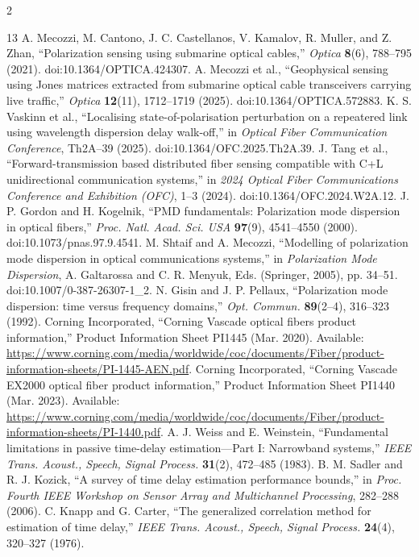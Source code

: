 \documentclass[10pt]{article}
\begin{document}
\begin{multicols}{2}
\begin{thebibliography}{13}\scriptsize
\setlength{\itemsep}{0pt}\setlength{\parskip}{0pt}
 A. Mecozzi, M. Cantono, J. C. Castellanos, V. Kamalov, R. Muller, and Z. Zhan, ``Polarization sensing using submarine optical cables,'' \emph{Optica} \textbf{8}(6), 788--795 (2021). doi:10.1364/OPTICA.424307.
 A. Mecozzi et al., ``Geophysical sensing using Jones matrices extracted from submarine optical cable transceivers carrying live traffic,'' \emph{Optica} \textbf{12}(11), 1712--1719 (2025). doi:10.1364/OPTICA.572883.
 K. S. Vaskinn et al., ``Localising state-of-polarisation perturbation on a repeatered link using wavelength dispersion delay walk-off,'' in \emph{Optical Fiber Communication Conference}, Th2A--39 (2025). doi:10.1364/OFC.2025.Th2A.39.
 J. Tang et al., ``Forward-transmission based distributed fiber sensing compatible with C+L unidirectional communication systems,'' in \emph{2024 Optical Fiber Communications Conference and Exhibition (OFC)}, 1--3 (2024). doi:10.1364/OFC.2024.W2A.12.
 J. P. Gordon and H. Kogelnik, ``PMD fundamentals: Polarization mode dispersion in optical fibers,'' \emph{Proc. Natl. Acad. Sci. USA} \textbf{97}(9), 4541--4550 (2000). doi:10.1073/pnas.97.9.4541.
 M. Shtaif and A. Mecozzi, ``Modelling of polarization mode dispersion in optical communications systems,'' in \emph{Polarization Mode Dispersion}, A. Galtarossa and C. R. Menyuk, Eds. (Springer, 2005), pp. 34--51. doi:10.1007/0-387-26307-1\_2.
 N. Gisin and J. P. Pellaux, ``Polarization mode dispersion: time versus frequency domains,'' \emph{Opt. Commun.} \textbf{89}(2--4), 316--323 (1992).
 Corning Incorporated, ``Corning Vascade optical fibers product information,'' Product Information Sheet PI1445 (Mar. 2020). Available: \url{https://www.corning.com/media/worldwide/coc/documents/Fiber/product-information-sheets/PI-1445-AEN.pdf}.
 Corning Incorporated, ``Corning Vascade EX2000 optical fiber product information,'' Product Information Sheet PI1440 (Mar. 2023). Available: \url{https://www.corning.com/media/worldwide/coc/documents/Fiber/product-information-sheets/PI-1440.pdf}.
 A. J. Weiss and E. Weinstein, ``Fundamental limitations in passive time-delay estimation---Part I: Narrowband systems,'' \emph{IEEE Trans. Acoust., Speech, Signal Process.} \textbf{31}(2), 472--485 (1983).
 B. M. Sadler and R. J. Kozick, ``A survey of time delay estimation performance bounds,'' in \emph{Proc. Fourth IEEE Workshop on Sensor Array and Multichannel Processing}, 282--288 (2006).
 C. Knapp and G. Carter, ``The generalized correlation method for estimation of time delay,'' \emph{IEEE Trans. Acoust., Speech, Signal Process.} \textbf{24}(4), 320--327 (1976).
\end{thebibliography}
\end{multicols}
\end{document}
